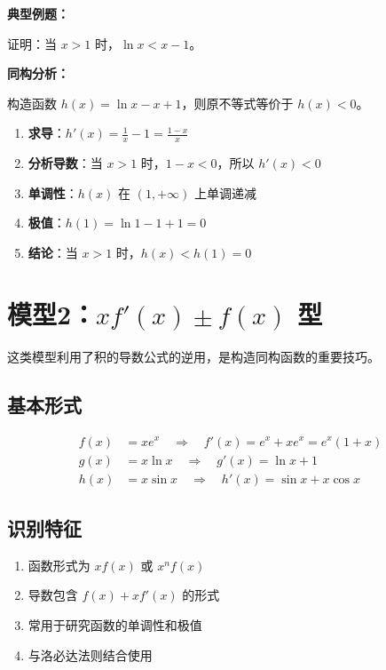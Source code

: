 \documentclass[a4paper,11pt]{ctexrep}
\newcommand{\exampleicon}{\ModeBadge[highlight]{例题}}
\newcommand{\analysisicon}{\ModeBadge[secondary]{分析}}
\theoremstyle{definition}
\begin{document}
\exampleicon \textbf{典型例题：}

证明：当 $x > 1$ 时，$\ln x < x - 1$。

\analysisicon \textbf{同构分析：}

构造函数 $h(x) = \ln x - x + 1$，则原不等式等价于 $h(x) < 0$。

\begin{enumerate}
    \item \textbf{求导}：$h'(x) = \frac{1}{x} - 1 = \frac{1-x}{x}$
    \item \textbf{分析导数}：当 $x > 1$ 时，$1-x < 0$，所以 $h'(x) < 0$
    \item \textbf{单调性}：$h(x)$ 在 $(1, +\infty)$ 上单调递减
    \item \textbf{极值}：$h(1) = \ln 1 - 1 + 1 = 0$
    \item \textbf{结论}：当 $x > 1$ 时，$h(x) < h(1) = 0$
\end{enumerate}

\section{模型2：$xf'(x) \pm f(x)$ 型}

这类模型利用了积的导数公式的逆用，是构造同构函数的重要技巧。

\subsection{基本形式}

\begin{definitionbox}[积的导数逆用型]
\begin{align}
f(x) &= xe^x \quad \Rightarrow \quad f'(x) = e^x + xe^x = e^x(1+x) \\
g(x) &= x\ln x \quad \Rightarrow \quad g'(x) = \ln x + 1 \\
h(x) &= x\sin x \quad \Rightarrow \quad h'(x) = \sin x + x\cos x
\end{align}
\end{definitionbox}

\subsection{识别特征}

\begin{tipbox}[积的导数逆用识别要点]
\begin{enumerate}
    \item 函数形式为 $xf(x)$ 或 $x^n f(x)$
    \item 导数包含 $f(x) + xf'(x)$ 的形式
    \item 常用于研究函数的单调性和极值
    \item 与洛必达法则结合使用
\end{enumerate}
\end{tipbox}
\end{document}
